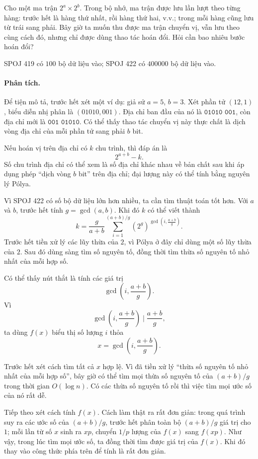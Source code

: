 \documentclass[11pt]{article}
\begin{document}
Cho một ma trận \(2^a\times 2^b\). Trong bộ nhớ, ma trận được lưu lần lượt
theo từng hàng: trước hết là hàng thứ nhất, rồi hàng thứ hai, v.v.; trong mỗi
hàng cũng lưu từ trái sang phải. Bây giờ ta muốn thu được ma trận chuyển vị,
vẫn lưu theo cùng cách đó, nhưng chỉ được dùng thao tác hoán đổi. Hỏi cần bao
nhiêu bước hoán đổi?

SPOJ 419 có \(100\) bộ dữ liệu vào; SPOJ 422 có \(400000\) bộ dữ liệu vào.

\paragraph{Phân tích.}
Để tiện mô tả, trước hết xét một ví dụ: giả sử \(a=5\), \(b=3\). Xét phần tử
\((12,1)\), biểu diễn nhị phân là \((01010,001)\). Địa chỉ ban đầu của nó là
\(\texttt{01010 001}\), còn địa chỉ mới là \(\texttt{001 01010}\). Có thể
thấy thao tác chuyển vị này thực chất là dịch vòng địa chỉ của mỗi phần tử
sang phải \(b\) bit.

Nếu hoán vị trên địa chỉ có \(k\) chu trình, thì đáp án là
\[
  2^{a+b}-k.
\]
Số chu trình địa chỉ có thể xem là số địa chỉ khác nhau về bản chất sau khi
áp dụng phép ``dịch vòng \(b\) bit'' trên địa chỉ; đại lượng này có thể tính
bằng nguyên lý Pólya.

Vì SPOJ 422 có số bộ dữ liệu lớn hơn nhiều, ta cần tìm thuật toán tốt hơn.
Với \(a\) và \(b\), trước hết tính \(g=\gcd(a,b)\). Khi đó \(k\) có thể viết
thành
\[
  k=\frac{g}{a+b}
    \sum_{i=1}^{(a+b)/g}
      \left(2^g\right)^{\gcd\left(i,\frac{a+b}{g}\right)}.
\]
Trước hết tiền xử lý các lũy thừa của \(2\), vì Pólya ở đây chỉ dùng một số
lũy thừa của \(2\). Sau đó dùng sàng tìm số nguyên tố, đồng thời tìm thừa số
nguyên tố nhỏ nhất của mỗi hợp số.

Có thể thấy nút thắt là tính các giá trị
\[
  \gcd\left(i,\frac{a+b}{g}\right).
\]
Vì
\[
  \gcd\left(i,\frac{a+b}{g}\right)\mid \frac{a+b}{g},
\]
ta dùng \(f(x)\) biểu thị số lượng \(i\) thỏa
\[
  x=\gcd\left(i,\frac{a+b}{g}\right).
\]

Trước hết xét cách tìm tất cả \(x\) hợp lệ. Vì đã tiền xử lý ``thừa số nguyên
tố nhỏ nhất của mỗi hợp số'', bây giờ có thể tìm mọi thừa số nguyên tố của
\((a+b)/g\) trong thời gian \(O(\log n)\). Có các thừa số nguyên tố rồi thì
việc tìm mọi ước số của nó rất dễ.

Tiếp theo xét cách tính \(f(x)\). Cách làm thật ra rất đơn giản: trong quá
trình suy ra các ước số của \((a+b)/g\), trước hết phân toàn bộ \((a+b)/g\)
giá trị cho \(1\); mỗi lần từ số \(x\) sinh ra \(xp\), chuyển \(1/p\) lượng
của \(f(x)\) sang \(f(xp)\). Như vậy, trong lúc tìm mọi ước số, ta đồng thời
tìm được giá trị của \(f(x)\). Khi đó thay vào công thức phía trên để tính là
rất đơn giản.
\end{document}
